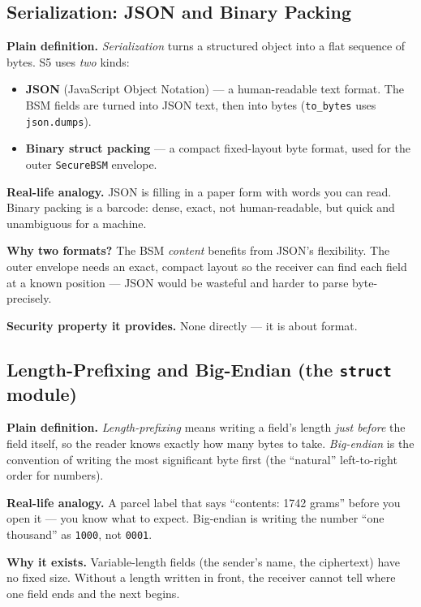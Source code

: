 \documentclass[11pt,a4paper]{report}
\begin{document}
\subsection{Serialization: JSON and Binary Packing}
\textbf{Plain definition.} \emph{Serialization} turns a structured object into a
flat sequence of bytes. S5 uses \emph{two} kinds:
\begin{itemize}
  \item \textbf{JSON} (JavaScript Object Notation) --- a human-readable text
        format. The BSM fields are turned into JSON text, then into bytes
        (\texttt{to\_bytes} uses \texttt{json.dumps}).
  \item \textbf{Binary struct packing} --- a compact fixed-layout byte format,
        used for the outer \texttt{SecureBSM} envelope.
\end{itemize}

\textbf{Real-life analogy.} JSON is filling in a paper form with words you can
read. Binary packing is a barcode: dense, exact, not human-readable, but quick
and unambiguous for a machine.

\textbf{Why two formats?} The BSM \emph{content} benefits from JSON's
flexibility. The outer envelope needs an exact, compact layout so the receiver
can find each field at a known position --- JSON would be wasteful and harder to
parse byte-precisely.

\textbf{Security property it provides.} None directly --- it is about format.

\subsection{Length-Prefixing and Big-Endian (the \texttt{struct} module)}
\textbf{Plain definition.} \emph{Length-prefixing} means writing a field's length
\emph{just before} the field itself, so the reader knows exactly how many bytes
to take. \emph{Big-endian} is the convention of writing the most significant byte
first (the ``natural'' left-to-right order for numbers).

\textbf{Real-life analogy.} A parcel label that says ``contents: 1742 grams''
before you open it --- you know what to expect. Big-endian is writing the number
``one thousand'' as \texttt{1000}, not \texttt{0001}.

\textbf{Why it exists.} Variable-length fields (the sender's name, the
ciphertext) have no fixed size. Without a length written in front, the receiver
cannot tell where one field ends and the next begins.
\end{document}
